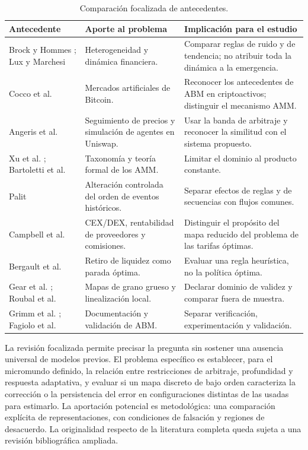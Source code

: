 \begin{table}[htbp]
\centering
\caption{Comparación focalizada de antecedentes.}
\label{tab:antecedentes}
\small
\begin{tabularx}{\textwidth}{@{}>{\raggedright\arraybackslash}p{3.3cm} >{\raggedright\arraybackslash}X >{\raggedright\arraybackslash}X@{}}
\toprule
Antecedente & Aporte al problema & Implicación para el estudio \\
\midrule
Brock y Hommes \cite{brock1998heterogeneous}; Lux y Marchesi \cite{lux1999scaling} & Heterogeneidad y dinámica financiera. & Comparar reglas de ruido y de tendencia; no atribuir toda la dinámica a la emergencia. \\
Cocco et al. \cite{cocco2017artificial,cocco2019agent} & Mercados artificiales de Bitcoin. & Reconocer los antecedentes de ABM en criptoactivos; distinguir el mecanismo AMM. \\
Angeris et al. \cite{angeris2020uniswap} & Seguimiento de precios y simulación de agentes en Uniswap. & Usar la banda de arbitraje y reconocer la similitud con el sistema propuesto. \\
Xu et al. \cite{xu2023sok}; Bartoletti et al. \cite{bartoletti2022theory} & Taxonomía y teoría formal de los AMM. & Limitar el dominio al producto constante. \\
Palit \cite{palit2022shuffled} & Alteración controlada del orden de eventos históricos. & Separar efectos de reglas y de secuencias con flujos comunes. \\
Campbell et al. \cite{campbell2025optimal} & CEX/DEX, rentabilidad de proveedores y comisiones. & Distinguir el propósito del mapa reducido del problema de las tarifas óptimas. \\
Bergault et al. \cite{bergault2025exit} & Retiro de liquidez como parada óptima. & Evaluar una regla heurística, no la política óptima. \\
Gear et al. \cite{gear2003equationfree}; Roubal et al. \cite{roubal2010linearization} & Mapas de grano grueso y linealización local. & Declarar dominio de validez y comparar fuera de muestra. \\
Grimm et al. \cite{grimm2020odd}; Fagiolo et al. \cite{fagiolo2007critical} & Documentación y validación de ABM. & Separar verificación, experimentación y validación. \\
\bottomrule
\end{tabularx}
\end{table}

La revisión focalizada permite precisar la pregunta sin sostener una ausencia universal de modelos previos. El problema específico es establecer, para el micromundo definido, la relación entre restricciones de arbitraje, profundidad y respuesta adaptativa, y evaluar si un mapa discreto de bajo orden caracteriza la corrección o la persistencia del error en configuraciones distintas de las usadas para estimarlo. La aportación potencial es metodológica: una comparación explícita de representaciones, con condiciones de falsación y regiones de desacuerdo. La originalidad respecto de la literatura completa queda sujeta a una revisión bibliográfica ampliada.

